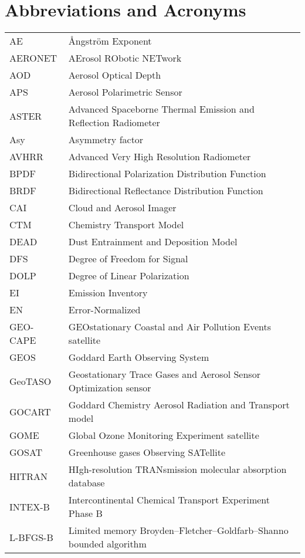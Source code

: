 \chapter{Abbreviations and Acronyms}

\begingroup
\onehalfspacing
\begin{center}
\begin{small}
\begin{longtable}{p{6em} p{30em} }
AE   & Ångström Exponent \\
AERONET	& AErosol RObotic NETwork \\
AOD	& Aerosol Optical Depth \\
APS	& Aerosol Polarimetric Sensor \\
ASTER & Advanced Spaceborne Thermal Emission and Reflection Radiometer \\
Asy	& Asymmetry factor \\
AVHRR & Advanced Very High Resolution Radiometer \\
BPDF & Bidirectional Polarization Distribution Function \\
BRDF & Bidirectional Reflectance Distribution Function \\
CAI & Cloud and Aerosol Imager  \\
CTM & Chemistry Transport Model \\
DEAD & Dust Entrainment and Deposition Model \\
DFS & Degree of Freedom for Signal \\
DOLP & Degree of Linear Polarization \\
EI & Emission Inventory \\
EN & Error-Normalized  \\
GEO-CAPE & GEOstationary Coastal and Air Pollution Events satellite \\
GEOS & Goddard Earth Observing System \\
GeoTASO &  Geostationary Trace Gases and Aerosol Sensor Optimization sensor \\
GOCART &  Goddard Chemistry Aerosol Radiation and Transport model \\
GOME & Global Ozone Monitoring Experiment satellite \\
GOSAT &Greenhouse gases Observing SATellite  \\
HITRAN &HIgh-resolution TRANsmission molecular absorption database \\
INTEX-B &Intercontinental Chemical Transport Experiment Phase B \\
L-BFGS-B & Limited memory Broyden–Fletcher–Goldfarb–Shanno bounded algorithm \\

\end{longtable}
\end{small}
\end{center}
